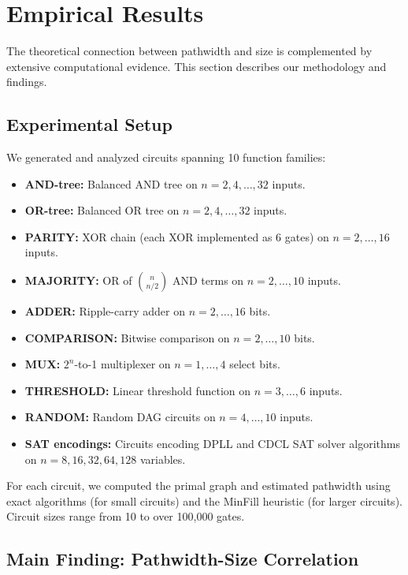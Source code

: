 \documentclass[11pt]{article}
\theoremstyle{plain}
\theoremstyle{definition}
\begin{document}
\section{Empirical Results}\label{sec:empirical}

The theoretical connection between pathwidth and size is complemented by extensive computational evidence. This section describes our methodology and findings.

\subsection{Experimental Setup}

We generated and analyzed circuits spanning 10 function families:

\begin{itemize}
    \item \textbf{AND-tree:} Balanced AND tree on $n = 2, 4, \ldots, 32$ inputs.
    \item \textbf{OR-tree:} Balanced OR tree on $n = 2, 4, \ldots, 32$ inputs.
    \item \textbf{PARITY:} XOR chain (each XOR implemented as 6 gates) on $n = 2, \ldots, 16$ inputs.
    \item \textbf{MAJORITY:} OR of $\binom{n}{n/2}$ AND terms on $n = 2, \ldots, 10$ inputs.
    \item \textbf{ADDER:} Ripple-carry adder on $n = 2, \ldots, 16$ bits.
    \item \textbf{COMPARISON:} Bitwise comparison on $n = 2, \ldots, 10$ bits.
    \item \textbf{MUX:} $2^n$-to-1 multiplexer on $n = 1, \ldots, 4$ select bits.
    \item \textbf{THRESHOLD:} Linear threshold function on $n = 3, \ldots, 6$ inputs.
    \item \textbf{RANDOM:} Random DAG circuits on $n = 4, \ldots, 10$ inputs.
    \item \textbf{SAT encodings:} Circuits encoding DPLL and CDCL SAT solver algorithms on $n = 8, 16, 32, 64, 128$ variables.
\end{itemize}

For each circuit, we computed the primal graph and estimated pathwidth using exact algorithms (for small circuits) and the MinFill heuristic (for larger circuits). Circuit sizes range from 10 to over 100{,}000 gates.

\subsection{Main Finding: Pathwidth-Size Correlation}
\end{document}
